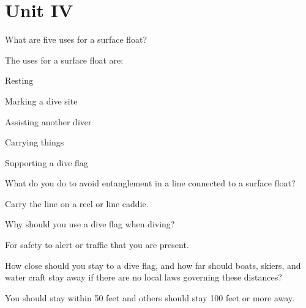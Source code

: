 	\chapter*{Unit IV}
	\setcounter{questionnumber}{0}

	\begin{qanda}
		\begin{question}
What are five uses for a surface float?
		\end{question}

		\begin{answer}
The uses for a surface float are:
			\begin{nospacenumberedlist}
				\item Resting
				\item Marking a dive site
				\item Assisting another diver
				\item Carrying things
				\item Supporting a dive flag
			\end{nospacenumberedlist}
		\end{answer}
	\end{qanda}

	\begin{qanda}
		\begin{question}
What do you do to avoid entanglement in a line connected to a surface float?
		\end{question}

		\begin{answer}
Carry the line on a reel or line caddie.
		\end{answer}
	\end{qanda}

	\begin{qanda}
		\begin{question}
Why should you use a dive flag when diving?
		\end{question}

		\begin{answer}
For safety to alert or traffic that you are present.
		\end{answer}
	\end{qanda}

	\begin{qanda}
		\begin{question}
How close should you stay to a dive flag, and how far should boats, skiers, and water craft stay away if there are no local laws governing these distances?
		\end{question}

		\begin{answer}
You should stay within 50 feet and others should stay 100 feet or more away.
		\end{answer}
	\end{qanda}

